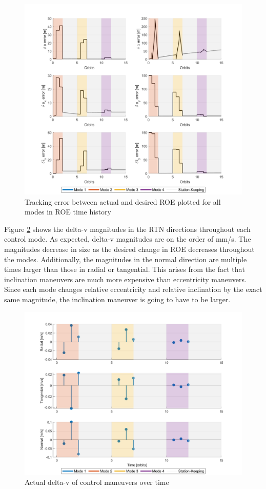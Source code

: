 \begin{figure}[H]
    \centering
    \includegraphics[width=0.75\linewidth]{sim/figures/PS5/ROE_error_over_time_modes.png}
    \caption{Tracking error between actual and desired ROE plotted for all modes in ROE time history}
    \label{fig:roe_error_time_modes}
\end{figure}

Figure \ref{fig:delta_v_modes} shows the delta-v magnitudes in the RTN directions throughout each control mode. As expected, delta-v magnitudes are on the order of mm/s. The magnitudes decrease in size as the desired change in ROE decreases throughout the modes. Additionally, the magnitudes in the normal direction are multiple times larger than those in radial or tangential. This arises from the fact that inclination maneuvers are much more expensive than eccentricity maneuvers. Since each mode changes relative eccentricity and relative inclination by the exact same magnitude, the inclination maneuver is going to have to be larger. 
\begin{figure}[H]
    \centering
    \includegraphics[width=0.75\linewidth]{sim/figures/PS5/delta_v_timeline_modes.png}
    \caption{Actual delta-v of control maneuvers over time}
    \label{fig:delta_v_modes}
\end{figure}

